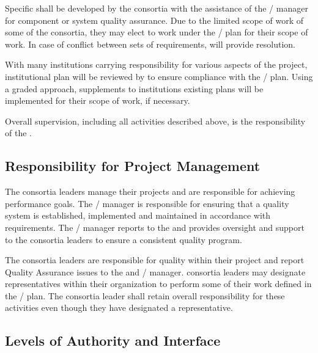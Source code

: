 Specific  shall be developed by the consortia with the
assistance of the /  manager for
component or system quality assurance. Due to the limited scope of
work of some of the consortia, they may elect to work under the
/  plan for their scope of work. In case of conflict between
sets of   requirements,   will provide
resolution.

With many institutions carrying responsibility for various aspects of
the project, institutional  plan will be reviewed by 
 to ensure compliance with the /  plan. Using a
graded approach, supplements to institutions existing plans will be
implemented for their  scope of work, if necessary.

Overall  supervision, including all activities described above, is
the responsibility of the  .

\subsection{Responsibility for Project Management}

The  consortia leaders manage their projects and are
responsible for achieving performance goals. The
/  manager is responsible for
ensuring that a quality system is established, implemented and
maintained in accordance with requirements. The
/  manager reports to the
  and provides oversight and support
to the consortia leaders to ensure a consistent quality program.

The  consortia leaders are responsible for quality within
their project and report Quality Assurance issues to the 
 and / 
manager.  consortia leaders may designate 
representatives within their organization to perform some of their
work defined in the /  plan. The
 consortia leader shall retain overall responsibility for
these activities even though they have designated a 
representative.

\subsection{Levels of Authority and Interface}

